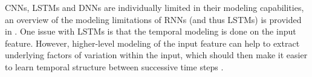 

CNNs, LSTMs and DNNs are individually limited in their modeling capabilities, an overview of the modeling limitations of RNNs (and thus LSTMs) is provided in \cite{Pascanu2014}. One issue with LSTMs is that the temporal modeling is done on the input feature. However, higher-level modeling of the input feature can help to extract underlying factors of variation within the input, which should then make it easier to learn temporal structure between successive time steps \cite{Pascanu2014}.  %


